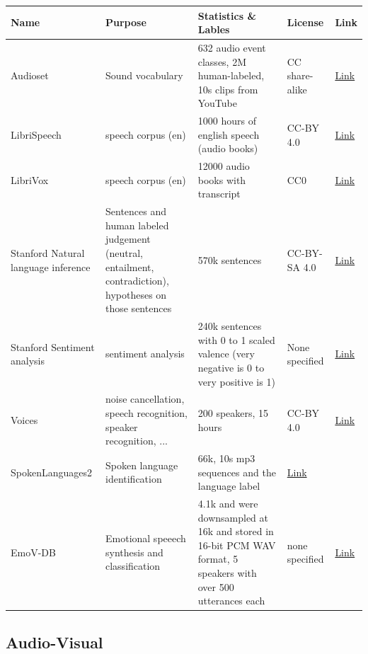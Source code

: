\begin{longtable}[]{@{}p{}p{}p{}p{}p{}@{}}
\toprule
Name & Purpose & Statistics \& Lables & License & Link\tabularnewline
\midrule
\endhead
Audioset & Sound vocabulary & 632 audio event classes, 2M human-labeled,
10s clips from YouTube & CC share-alike &
\href{https://research.google.com/audioset/index.html}{Link}\tabularnewline
LibriSpeech & speech corpus (en) & 1000 hours of english speech (audio
books) & CC-BY 4.0 & \href{http://openslr.org/12/}{Link}\tabularnewline
LibriVox & speech corpus (en) & 12000 audio books with transcript & CC0
&
\href{https://librivox.org/search?primary_key=0\&search_category=genre\&search_page=1\&search_form=get_results}{Link}\tabularnewline
Stanford Natural language inference & Sentences and human labeled
judgement (neutral, entailment, contradiction), hypotheses on those
sentences & 570k sentences & CC-BY-SA 4.0 &
\href{https://nlp.stanford.edu/projects/snli/}{Link}\tabularnewline
Stanford Sentiment analysis & sentiment analysis & 240k sentences with 0
to 1 scaled valence (very negative is 0 to very positive is 1) & None
specified &
\href{https://nlp.stanford.edu/sentiment/code.html}{Link}\tabularnewline
Voices & noise cancellation, speech recognition, speaker recognition,
... & 200 speakers, 15 hours & CC-BY 4.0 &
\href{https://voices18.github.io/}{Link}\tabularnewline
SpokenLanguages2 & Spoken language identification & 66k, 10s mp3
sequences and the language label &
\href{https://community.topcoder.com/longcontest/?module=ViewProblemStatement\&rd=16555\&pm=13978}{Link}
&\tabularnewline
EmoV-DB & Emotional speeech synthesis and classification & 4.1k and were
downsampled at 16k and stored in 16-bit PCM WAV format, 5 speakers with
over 500 utterances each & none specified &
\href{http://www.coe.neu.edu/Research/AClab/Speech\%20Data/}{Link}\tabularnewline
\bottomrule
\end{longtable}

\hypertarget{audio-visual}{%
\subsection{Audio-Visual}\label{audio-visual}}

